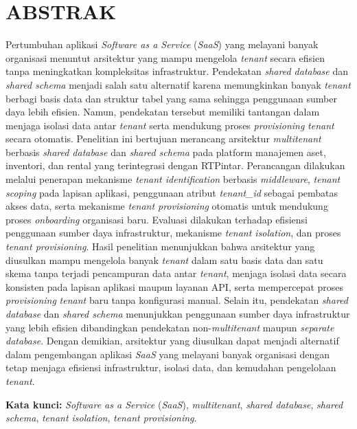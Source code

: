 \chapter*{ABSTRAK}

Pertumbuhan aplikasi \textit{Software as a Service} (\textit{SaaS}) yang melayani banyak organisasi menuntut arsitektur yang mampu mengelola \textit{tenant} secara efisien tanpa meningkatkan kompleksitas infrastruktur. Pendekatan \textit{shared database} dan \textit{shared schema} menjadi salah satu alternatif karena memungkinkan banyak \textit{tenant} berbagi basis data dan struktur tabel yang sama sehingga penggunaan sumber daya lebih efisien. Namun, pendekatan tersebut memiliki tantangan dalam menjaga isolasi data antar \textit{tenant} serta mendukung proses \textit{provisioning} \textit{tenant} secara otomatis. Penelitian ini bertujuan merancang arsitektur \textit{multitenant} berbasis \textit{shared database} dan \textit{shared schema} pada platform manajemen aset, inventori, dan rental yang terintegrasi dengan RTPintar. Perancangan dilakukan melalui penerapan mekanisme \textit{tenant identification} berbasis \textit{middleware}, \textit{tenant scoping} pada lapisan aplikasi, penggunaan atribut \textit{tenant\_id} sebagai pembatas akses data, serta mekanisme \textit{tenant provisioning} otomatis untuk mendukung proses \textit{onboarding} organisasi baru. Evaluasi dilakukan terhadap efisiensi penggunaan sumber daya infrastruktur, mekanisme \textit{tenant isolation}, dan proses \textit{tenant provisioning}. Hasil penelitian menunjukkan bahwa arsitektur yang diusulkan mampu mengelola banyak \textit{tenant} dalam satu basis data dan satu skema tanpa terjadi pencampuran data antar \textit{tenant}, menjaga isolasi data secara konsisten pada lapisan aplikasi maupun layanan API, serta mempercepat proses \textit{provisioning} \textit{tenant} baru tanpa konfigurasi manual. Selain itu, pendekatan \textit{shared database} dan \textit{shared schema} menunjukkan penggunaan sumber daya infrastruktur yang lebih efisien dibandingkan pendekatan non-\textit{multitenant} maupun \textit{separate database}. Dengan demikian, arsitektur yang diusulkan dapat menjadi alternatif dalam pengembangan aplikasi \textit{SaaS} yang melayani banyak organisasi dengan tetap menjaga efisiensi infrastruktur, isolasi data, dan kemudahan pengelolaan \textit{tenant}.

\vspace{1cm}

\noindent\textbf{Kata kunci:} \textit{Software as a Service} (\textit{SaaS}), \textit{multitenant}, \textit{shared database}, \textit{shared schema}, \textit{tenant isolation}, \textit{tenant provisioning}.
